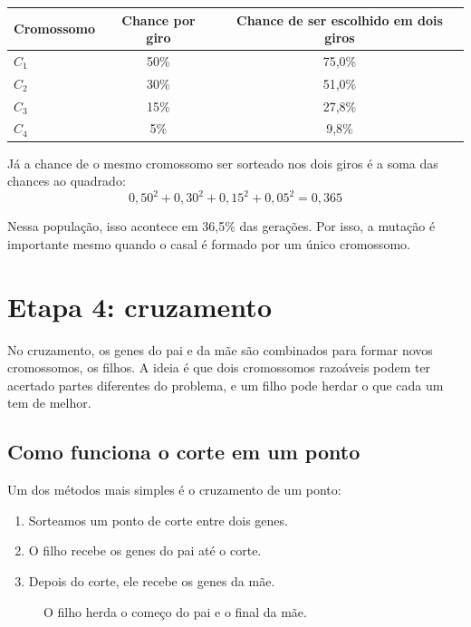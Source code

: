 \documentclass[11pt,a4paper]{article}
\newenvironment{tabela}{\par\nopagebreak[4]\vspace{0.3em}\nopagebreak[4]\begingroup\centering\small}{\par\endgroup\vspace{0.6em}}
\newcommand{\celula}[4]{%
  \node[draw=white,line width=1.2pt,fill=#4,minimum width=1.15cm,minimum height=0.62cm,
    inner sep=0pt,font=\small,text=tinta] at (#1,#2) {#3};}
\begin{document}
\begin{tabela}
\begin{tabular}{lcc}
\toprule
Cromossomo & Chance por giro & Chance de ser escolhido em dois giros\\
\midrule
$C_1$ & 50\% & 75,0\%\\
$C_2$ & 30\% & 51,0\%\\
$C_3$ & 15\% & 27,8\%\\
$C_4$ & 5\% & 9,8\%\\
\bottomrule
\end{tabular}
\end{tabela}

Já a chance de o mesmo cromossomo ser sorteado nos dois giros é a soma das chances ao quadrado:
\[
  0{,}50^2 + 0{,}30^2 + 0{,}15^2 + 0{,}05^2 = 0{,}365
\]

Nessa população, isso acontece em 36,5\% das gerações. Por isso, a mutação é importante mesmo quando o casal é formado por um único cromossomo.

\clearpage
\section{Etapa 4: cruzamento}

No cruzamento, os genes do pai e da mãe são combinados para formar novos cromossomos, os filhos. A ideia é que dois cromossomos razoáveis podem ter acertado partes diferentes do problema, e um filho pode herdar o que cada um tem de melhor.

\subsection{Como funciona o corte em um ponto}

Um dos métodos mais simples é o cruzamento de um ponto:
\begin{enumerate}
  \item Sorteamos um ponto de corte entre dois genes.
  \item O filho recebe os genes do pai até o corte.
  \item Depois do corte, ele recebe os genes da mãe.
\end{enumerate}

\begin{figure}[H]
\centering
{}
\caption{O filho herda o começo do pai e o final da mãe.}
\label{fig:cruzamento}
\end{figure}
\end{document}
